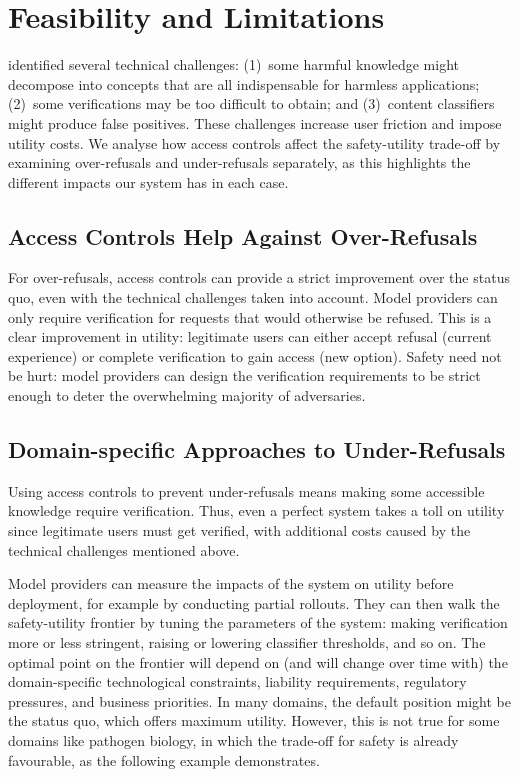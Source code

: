 \documentclass{article}
\theoremstyle{plain}
\theoremstyle{definition}
\theoremstyle{remark}
\begin{document}
\section{Feasibility and Limitations}
\label{section:feasibility-and-limitations}

 identified several technical challenges: (1)~some harmful knowledge might decompose into concepts that are all indispensable for harmless applications; (2)~some verifications may be too difficult to obtain; and (3)~content classifiers might produce false positives.
These challenges increase user friction and impose utility costs.
We analyse how access controls affect the safety-utility trade-off by examining over-refusals and under-refusals separately, as this highlights the different impacts our system has in each case.

\subsection{Access Controls Help Against Over-Refusals}

For over-refusals, access controls can provide a strict improvement over the status quo, even with the technical challenges taken into account.
Model providers can only require verification for requests that would otherwise be refused.
This is a clear improvement in utility: legitimate users can either accept refusal (current experience) or complete verification to gain access (new option).
Safety need not be hurt: model providers can design the verification requirements to be strict enough to deter the overwhelming majority of adversaries.

\subsection{Domain-specific Approaches to Under-Refusals}

Using access controls to prevent under-refusals means making some accessible knowledge require verification.
Thus, even a perfect system takes a toll on utility since legitimate users must get verified, with additional costs caused by the technical challenges mentioned above.

Model providers can measure the impacts of the system on utility before deployment, for example by conducting partial rollouts.
They can then walk the safety-utility frontier by tuning the parameters of the system: making verification more or less stringent, raising or lowering classifier thresholds, and so on.
The optimal point on the frontier will depend on (and will change over time with) the domain-specific technological constraints, liability requirements, regulatory pressures, and business priorities.
In many domains, the default position might be the status quo, which offers maximum utility.
However, this is not true for some domains like pathogen biology, in which the trade-off for safety is already favourable, as the following example demonstrates.
\end{document}
